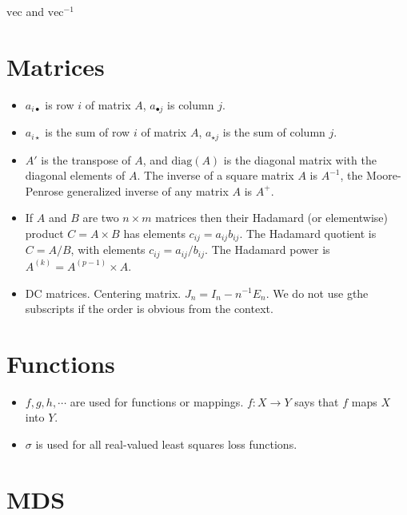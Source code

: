 \documentclass[
  12pt,
]{book}
\begin{document}
\(\text{vec}\) and \(\text{vec}^{-1}\)

\section{Matrices}\label{matrices}

\begin{itemize}
\item
  \(a_{i\bullet}\) is row \(i\) of matrix \(A\), \(a_{\bullet j}\) is column \(j\).
\item
  \(a_{i\star}\) is the sum of row \(i\) of matrix \(A\), \(a_{\star j}\) is the sum of column \(j\).
\item
  \(A'\) is the transpose of \(A\), and \(\text{diag}(A)\) is the diagonal
  matrix with the diagonal elements of \(A\). The inverse of a square
  matrix \(A\) is \(A^{-1}\), the Moore-Penrose generalized inverse of any matrix \(A\)
  is \(A^+\).
\item
  If \(A\) and \(B\) are two \(n\times m\) matrices then their Hadamard (or elementwise) product
  \(C=A\times B\) has elements \(c_{ij}=a_{ij}b_{ij}\). The Hadamard quotient is \(C=A/B\), with elements
  \(c_{ij}=a_{ij}/b_{ij}\). The Hadamard power is \(A^{(k)}=A^{(p-1)}\times A\).
\item
  DC matrices. Centering matrix.
  \(J_n=I_n-n^{-1}E_n\). We do not use gthe
  subscripts if the order is obvious from the context.
\end{itemize}

\section{Functions}\label{functions}

\begin{itemize}
\item
  \(f,g,h,\cdots\) are used for functions or mappings. \(f:X\rightarrow Y\) says that \(f\) maps \(X\) into \(Y\).
\item
  \(\sigma\) is used for all real-valued least squares loss functions.
\end{itemize}

\section{MDS}\label{mds}
\end{document}
